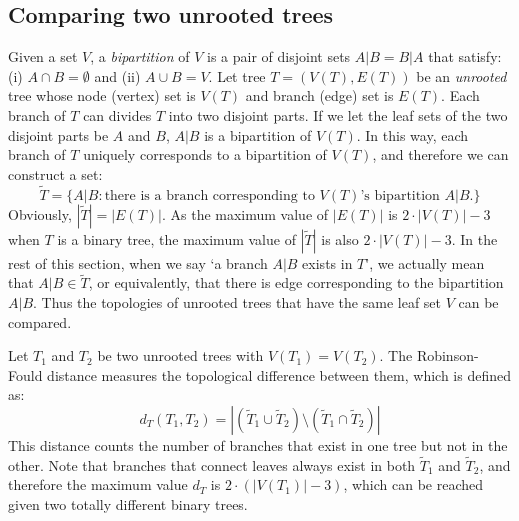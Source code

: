 \subsection{Comparing two unrooted trees}

Given a set $V$, a \emph{bipartition} of $V$ is a pair of disjoint sets $A|B=B|A$
that satisfy: (i) $A\cap B=\emptyset$ and (ii) $A\cup B=V$.
Let tree $T=(V(T),E(T))$ be an \emph{unrooted} tree whose node (vertex) set is $V(T)$ and
branch (edge) set is $E(T)$. Each branch of $T$ can divides $T$ into two disjoint parts.
If we let the leaf sets of the two disjoint parts be $A$ and $B$, $A|B$ is a bipartition
of $V(T)$. In this way, each branch of $T$ uniquely corresponds to a bipartition of $V(T)$,
and therefore we can construct a set:
\begin{equation}
\tilde{T}=\{A|B:\mbox{there is a branch corresponding to $V(T)$'s bipartition $A|B$.}\}
\end{equation}
Obviously, $|\tilde{T}|=|E(T)|$. As the maximum value of $|E(T)|$ is $2\cdot|V(T)|-3$ when
$T$ is a binary tree, the maximum value of $|\tilde{T}|$ is also $2\cdot|V(T)|-3$.
In the rest of this section, when we say `a branch $A|B$ exists in $T$', we
actually mean that $A|B\in\tilde{T}$, or equivalently, that there is edge corresponding to
the bipartition $A|B$.
Thus the topologies of unrooted trees that have the same leaf set $V$ can be compared.

Let $T_1$ and $T_2$ be two unrooted trees with $V(T_1)=V(T_2)$. The Robinson-Fould distance
measures the topological difference between them, which is defined as:
\begin{equation}
d_T(T_1,T_2)=|(\tilde{T}_1\cup\tilde{T}_2)\setminus(\tilde{T}_1\cap\tilde{T}_2)|
\end{equation}
This distance counts the number of branches that exist in one tree but not in the other.
Note that branches that connect leaves always exist in both $\tilde{T}_1$ and $\tilde{T}_2$, and therefore
the maximum value $d_T$ is $2\cdot(|V(T_1)|-3)$, which can be reached given two totally different
binary trees.

